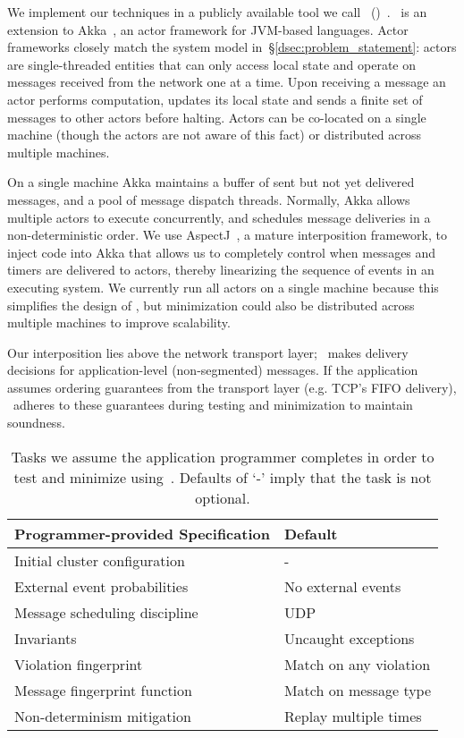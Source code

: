 We implement our techniques in a publicly available tool we call \sys~(\system)~\cite{our_repo}. \sys~is an extension
to Akka~\cite{akka}, an actor
framework for JVM-based languages.
Actor frameworks closely match the system model in~\S\ref{dsec:problem_statement}: actors
are single-threaded entities that can only access local state and operate on messages
received from the network one at a time. Upon receiving a message an actor performs computation,
updates its local state and sends a finite set of messages to other actors
before halting. Actors can be co-located
on a single machine (though the actors are not aware of this fact) or distributed across multiple machines.

On a single machine Akka maintains a buffer of sent but not yet delivered
messages, and a pool of message dispatch threads.
Normally, Akka allows multiple actors to execute
concurrently, and schedules message deliveries in a
non-deterministic order. We use AspectJ~\cite{kiczales2001overview}, a mature interposition framework,
to inject code into Akka that allows us to completely control when messages
and timers are
delivered to actors, thereby linearizing the sequence of events in an executing system.
We currently run all actors on a single machine because this simplifies the
design of \sys,
but minimization could also be distributed across multiple machines to improve
scalability.

Our interposition lies above the network transport layer; \sys~makes
delivery decisions for application-level (non-segmented) messages.
If the application assumes ordering guarantees from the transport
layer (e.g. TCP's FIFO delivery), \sys~adheres to these guarantees
during testing and minimization to maintain soundness.

\begin{table}[tb]
\centering
\begin{tabular}{l|l}
\textbf{Programmer-provided Specification} & \textbf{Default} \\
\hline
Initial cluster configuration & - \\
External event probabilities & No external events \\
Message scheduling discipline & UDP \\
Invariants & Uncaught exceptions \\
Violation fingerprint & Match on any violation \\
Message fingerprint function & Match on message type \\
Non-determinism mitigation & Replay multiple times
\end{tabular}
\caption{\label{tab:programmer_tasks} Tasks we assume the application
programmer completes in order to test and minimize using~\sys. Defaults
of `-' imply that the task is not optional.}
\end{table}

